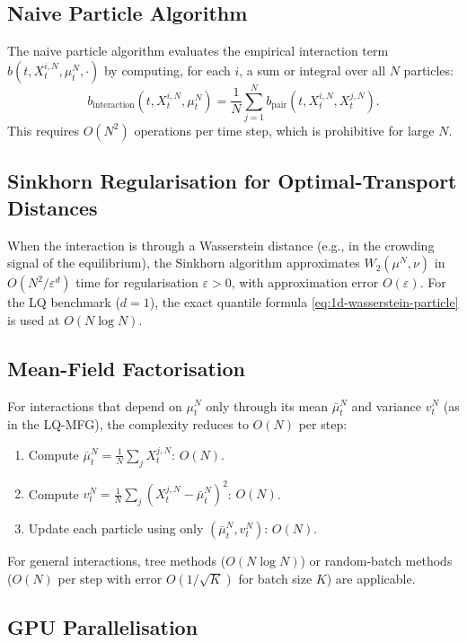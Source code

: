 \subsection{Naive Particle Algorithm}

The naive particle algorithm evaluates the empirical interaction term
$b(t, X_t^{i,N}, \mu_t^N, \cdot)$ by computing, for each $i$, a sum or integral
over all $N$ particles:
\[
    b_{\mathrm{interaction}}(t, X_t^{i,N}, \mu_t^N) = \frac{1}{N}\sum_{j=1}^N
    b_{\mathrm{pair}}(t, X_t^{i,N}, X_t^{j,N}).
\]
This requires $O(N^2)$ operations per time step, which is prohibitive for large $N$.

\subsection{Sinkhorn Regularisation for Optimal-Transport Distances}

When the interaction is through a Wasserstein distance (e.g., in the
crowding signal of the equilibrium), the Sinkhorn algorithm \citep{cuturi2013}
approximates $W_2(\mu^N, \nu)$ in $O(N^2 / \varepsilon^d)$ time for regularisation
$\varepsilon > 0$, with approximation error $O(\varepsilon)$. For the LQ benchmark
($d=1$), the exact quantile formula \eqref{eq:1d-wasserstein-particle} is used at $O(N\log N)$.

\subsection{Mean-Field Factorisation}

For interactions that depend on $\mu_t^N$ only through its mean $\bar\mu_t^N$ and
variance $v_t^N$ (as in the LQ-MFG), the complexity reduces to $O(N)$ per step:
\begin{enumerate}
    \item Compute $\bar\mu_t^N = \frac{1}{N}\sum_j X_t^{j,N}$: $O(N)$.
    \item Compute $v_t^N = \frac{1}{N}\sum_j (X_t^{j,N} - \bar\mu_t^N)^2$: $O(N)$.
    \item Update each particle using only $(\bar\mu_t^N, v_t^N)$: $O(N)$.
\end{enumerate}
For general interactions, tree methods ($O(N\log N)$) or random-batch methods
($O(N)$ per step with error $O(1/\sqrt{K})$ for batch size $K$) are applicable.

\subsection{GPU Parallelisation}

